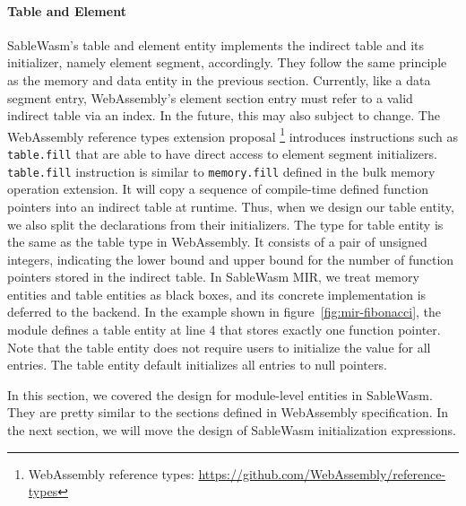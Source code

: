 \paragraph{Table and Element} SableWasm's table and element entity implements
the indirect table and its initializer, namely element segment, accordingly.
They follow the same principle as the memory and data entity in the previous
section. Currently, like a data segment entry, WebAssembly's element section
entry must refer to a valid indirect table via an index. In the future, this may
also subject to change. The WebAssembly reference types extension proposal
\footnote{WebAssembly reference types:
  \url{https://github.com/WebAssembly/reference-types}} introduces instructions
such as \texttt{table.fill} that are able to have direct access to element
segment initializers. \texttt{table.fill} instruction is similar to
\texttt{memory.fill} defined in the bulk memory operation extension. It will
copy a sequence of compile-time defined function pointers into an indirect table
at runtime. Thus, when we design our table entity, we also split the
declarations from their initializers. The type for table entity is the same as
the table type in WebAssembly. It consists of a pair of unsigned integers,
indicating the lower bound and upper bound for the number of function pointers
stored in the indirect table. In SableWasm MIR, we treat memory entities and
table entities as black boxes, and its concrete implementation is deferred to
the backend. In the example shown in figure~\ref{fig:mir-fibonacci}, the module
defines a table entity at line 4 that stores exactly one function pointer. Note
that the table entity does not require users to initialize the value for all
entries. The table entity default initializes all entries to null pointers.

In this section, we covered the design for module-level entities in SableWasm.
They are pretty similar to the sections defined in WebAssembly specification.
In the next section, we will move the design of SableWasm initialization
expressions.